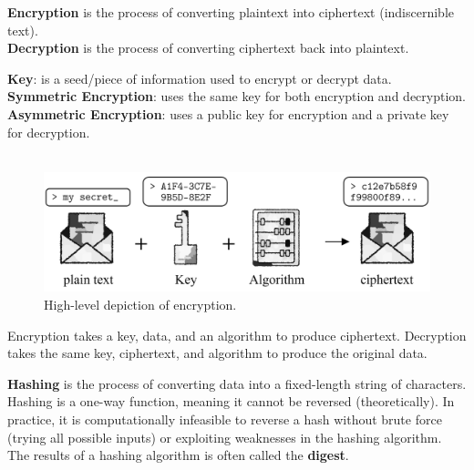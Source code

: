 \newpage 

\begin{Def}[Encryption]

    \textbf{Encryption} is the process of converting plaintext into ciphertext (indiscernible text).\\
    \textbf{Decryption} is the process of converting ciphertext back into plaintext.

\end{Def}
\begin{Def}
    
    \textbf{Key}: is a seed/piece of information used to encrypt or decrypt data.\\
    \textbf{Symmetric Encryption}: uses the same key for both encryption and decryption.\\
    \textbf{Asymmetric Encryption}: uses a public key for encryption and a private key for decryption.\\
    ${}$ \hfill \cite{adetunji_symmetric_asymmetric_encryption}
\end{Def}

\vspace{-1em}
\begin{figure}[h!]
    \centering
    \includegraphics[width=1\textwidth]{Sections/sec/encrypt.png}
    \caption{High-level depiction of encryption.}
    \label{fig:encryption}
\end{figure}

\noindent
Encryption takes a key, data, and an algorithm to produce ciphertext.
Decryption takes the same key, ciphertext, and algorithm to produce the original data.

\vspace{1em}
\begin{Def}[Hashing]
    \textbf{Hashing} is the process of converting data into a fixed-length string of characters.
    Hashing is a one-way function, meaning it cannot be reversed (theoretically). In practice, 
    it is computationally infeasible to reverse a hash without brute force (trying all possible inputs) 
    or exploiting weaknesses in the hashing algorithm. The results of a hashing algorithm 
    is often called the \textbf{digest}. \hfill \cite{codecademy_hashing}
\end{Def}

